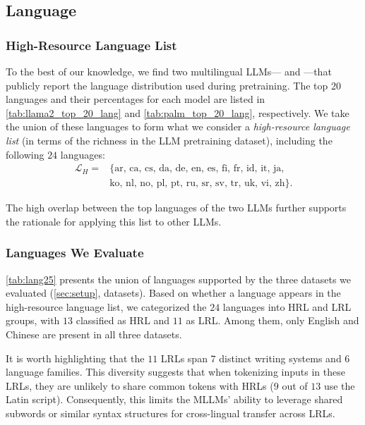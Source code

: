 \subsection{Language} \label{app:lang}
\subsubsection{High-Resource Language List} \label{app:lang:hrl_list}

To the best of our knowledge, we find two multilingual LLMs—\llamaTwo \cite{llama2} and \palm \cite{palm}—that publicly report the language distribution used during pretraining. The top 20 languages and their percentages for each model are listed in \cref{tab:llama2_top_20_lang} and \cref{tab:palm_top_20_lang}, respectively. We take the union of these languages to form what we consider a \textit{high-resource language list} (in terms of the richness in the LLM pretraining dataset), including the following $24$ languages:
\begin{equation}
    \begin{aligned}
        \mathcal{L}_{H} = & \{ \text{ar, ca, cs, da, de, en, es, fi, fr, id, it, ja, } \\
                          & \text{ko, nl, no, pl, pt, ru, sr, sv, tr, uk, vi, zh} \}.
    \end{aligned}
    \label{eq:high_lang_list}
\end{equation}

The high overlap between the top languages of the two LLMs further supports the rationale for applying this list to other LLMs.


\subsubsection{Languages We Evaluate}
\cref{tab:lang25} presents the union of languages supported by the three datasets we evaluated (\cref{sec:setup}, datasets). Based on whether a language appears in the high-resource language list, we categorized the $24$ languages into  HRL and LRL groups, with $13$ classified as HRL and $11$ as LRL. Among them, only English and Chinese are present in all three datasets.

It is worth highlighting that the $11$ LRLs span $7$ distinct writing systems and $6$ language families. This diversity suggests that when tokenizing inputs in these LRLs, they are unlikely to share common tokens with HRLs ($9$ out of $13$ use the Latin script). Consequently, this limits the MLLMs' ability to leverage shared subwords or similar syntax structures for cross-lingual transfer across LRLs.

